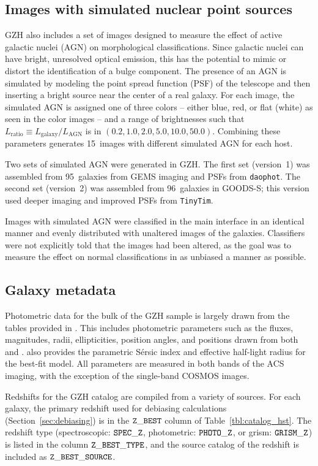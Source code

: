 \documentclass[twocolumn]{aastex6}
\begin{document}
\subsection{Images with simulated nuclear point sources}

GZH also includes a set of images designed to measure the effect of active galactic nuclei (AGN) on morphological classifications. Since galactic nuclei can have bright, unresolved optical emission, this has the potential to mimic or distort the identification of a bulge component. The presence of an AGN is simulated by modeling the point spread function (PSF) of the telescope and then inserting a bright source near the center of a real galaxy. For each image, the simulated AGN is assigned one of three colors -- either blue, red, or flat (white) as seen in the color images -- and a range of brightnesses such that $L_\mathrm{ratio} \equiv L_\mathrm{galaxy}/L_\mathrm{AGN}$ is in $(0.2,1.0,2.0,5.0,10.0,50.0)$. Combining these parameters generates 15~images with different simulated AGN for each host. 

Two sets of simulated AGN were generated in GZH. The first set (version~1) was assembled from 95~galaxies from GEMS imaging and PSFs from \texttt{daophot}. The second set (version~2) was assembled from 96~galaxies in GOODS-S; this version used deeper imaging and improved PSFs from \texttt{TinyTim}. 

Images with simulated AGN were classified in the main interface in an identical manner and evenly distributed with unaltered images of the galaxies. Classifiers were not explicitly told that the images had been altered, as the goal was to measure the effect on normal classifications in as unbiased a manner as possible. 

\subsection{Galaxy metadata}

Photometric data for the bulk of the GZH sample is largely drawn from the tables provided in \citet{gri12}. This includes photometric parameters such as the fluxes, magnitudes, radii, ellipticities, position angles, and positions drawn from both \sextractor{} and \galfit. \galfit{} also provides the parametric S\'{e}rsic index and effective half-light radius for the best-fit model. All parameters are measured in both bands of the ACS imaging, with the exception of the single-band COSMOS images.

Redshifts for the GZH catalog are compiled from a variety of sources. For each galaxy, the primary redshift used for debiasing calculations (Section~\ref{sec:debiasing}) is in the $\tt Z\_BEST$ column of Table~\ref{tbl:catalog_hst}. The redshift type (spectroscopic: $\tt SPEC\_Z$, photometric: $\tt PHOTO\_Z$, or grism: $ \tt GRISM\_Z$) is listed in the column $\tt Z\_BEST\_TYPE$, and the source catalog of the redshift is included as $\tt Z\_BEST\_SOURCE$. 
\end{document}
